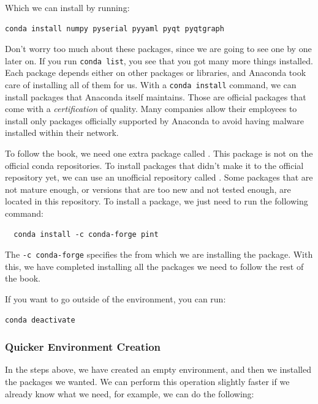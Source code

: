 Which we can install by running:

\begin{verbatim}
conda install numpy pyserial pyyaml pyqt pyqtgraph
\end{verbatim}

Don't worry too much about these packages, since we are going to see one by one later on. If you run \texttt{conda list}, you see that you got many more things installed. Each package depends either on other packages or libraries, and Anaconda took care of installing all of them for us. With a \texttt{conda install} command, we can install packages that Anaconda itself maintains. Those are official packages that come with a \emph{certification} of quality. Many companies allow their employees to install only packages officially supported by Anaconda to avoid having malware installed within their network.

To follow the book, we need one extra package called . This package is not on the official conda repositories. To install packages that didn't make it to the official repository yet, we can use an unofficial repository called . Some packages that are not mature enough, or versions that are too new and not tested enough, are located in this repository. To install a package, we just need to run the following command:

\begin{verbatim}
  conda install -c conda-forge pint
\end{verbatim}

The \texttt{-c conda-forge} specifies the  from which we are installing the package. With this, we have completed installing all the packages we need to follow the rest of the book.

If you want to go outside of the environment, you can run:

\begin{verbatim}
conda deactivate
\end{verbatim}

\subsubsection{Quicker Environment Creation}
In the steps above, we have created an empty environment, and then we installed the packages we wanted. We can perform this operation slightly faster if we already know what we need, for example, we can do the following:


